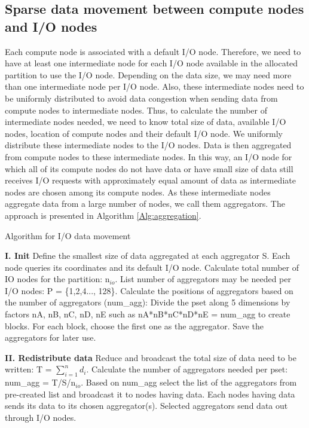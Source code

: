 \subsection{Sparse data movement between compute nodes and I/O nodes}
\label{sec:stagingandio}
Each compute node is associated with a default I/O node. Therefore, we need to have at least one intermediate node for each I/O node available in the allocated partition to use the I/O node.
Depending on the data size, we may need more than one intermediate node per I/O node. Also, these intermediate nodes need to be uniformly distributed to avoid data congestion when sending data from compute nodes to intermediate nodes. Thus, to calculate the number of intermediate nodes needed, we need to know total size of data, available I/O nodes, location of compute nodes and their default I/O node. We uniformly distribute these intermediate nodes to the I/O nodes. Data is then aggregated from compute nodes to these intermediate nodes. In this way, an I/O node for which all of its compute nodes do not have data or have small size of data still receives I/O requests with approximately equal amount of data as intermediate nodes are chosen among its compute nodes. As these intermediate nodes aggregate data from a large number of nodes, we call them aggregators. The approach is presented in Algorithm \ref{Alg:aggregation}.

\begin{algorithm}
\caption{Algorithm for I/O data movement}
\begin{algorithmic}
\STATE \textbf{I. Init}
\STATE Define the smallest size of data aggregated at each aggregator S.
\STATE Each node queries its coordinates and its default I/O node.
\STATE Calculate total number of IO nodes for the partition: n$_{io}$.
\STATE List number of aggregators may be needed per I/O nodes: P = \{1,2,4..., 128\}.
\STATE Calculate the positions of aggregators based on the number of aggregators (num\_agg):
\STATE Divide the pset along 5 dimensions by factors nA, nB, nC, nD, nE such as nA*nB*nC*nD*nE = num\_agg to create blocks.
\STATE For each block, choose the first one as the aggregator.
\STATE Save the aggregators for later use.
\ENDFOR

\STATE \textbf{II. Redistribute data}
\STATE Reduce and broadcast the total size of data need to be written: T = $\sum_{i=1}^{n}d_i$.
\STATE Calculate the number of aggregators needed per pset: num\_agg = T/S/n$_{io}$.
\STATE Based on num\_agg select the list of the aggregators from pre-created list and broadcast it to nodes having data.
\STATE Each nodes having data sends its data to its chosen aggregator(s).
\STATE Selected aggregators send data out through I/O nodes.
\end{algorithmic}
\label{Alg:aggregation}
\end{algorithm}


